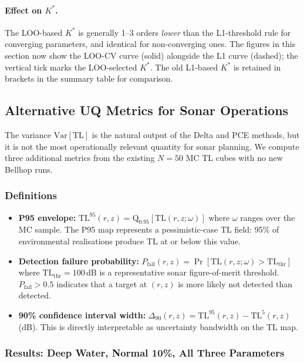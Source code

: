\documentclass[11pt,a4paper]{article}
\newcommand{\Var}{\mathrm{Var}}
\newcommand{\TL}{\mathrm{TL}}
\begin{document}
\paragraph{Effect on $K^*$.}
The LOO-based $K^*$ is generally 1--3 orders \emph{lower} than the L1-threshold
rule for converging parameters, and identical for non-converging ones.  The figures
in this section now show the LOO-CV curve (solid) alongside the L1 curve (dashed);
the vertical tick marks the LOO-selected $K^*$.  The old L1-based $K^*$ is retained
in brackets in the summary table for comparison.

\subsection{Alternative UQ Metrics for Sonar Operations}
\label{sec:metrics}

The variance $\Var[\TL]$ is the natural output of the Delta and PCE methods,
but it is not the most operationally relevant quantity for sonar planning.
We compute three additional metrics from the existing $N=50$ MC TL cubes
with no new Bellhop runs.

\subsubsection{Definitions}

\begin{itemize}
  \item \textbf{P95 envelope:} $\TL^{95}(r,z) = \mathrm{Q}_{0.95}[\TL(r,z;\omega)]$
        where $\omega$ ranges over the MC sample.  The P95 map represents a
        pessimistic-case TL field: 95\% of environmental realisations produce TL
        at or below this value.
  \item \textbf{Detection failure probability:}
        $P_\mathrm{fail}(r,z) = \Pr[\TL(r,z;\omega) > \TL_\mathrm{thr}]$
        where $\TL_\mathrm{thr} = 100$\,dB is a representative sonar figure-of-merit
        threshold.  $P_\mathrm{fail} > 0.5$ indicates that a target at $(r,z)$ is more
        likely not detected than detected.
  \item \textbf{90\% confidence interval width:}
        $\Delta_{90}(r,z) = \TL^{95}(r,z) - \TL^{5}(r,z)$ (dB).
        This is directly interpretable as uncertainty bandwidth on the TL map.
\end{itemize}

\subsubsection{Results: Deep Water, Normal 10\%, All Three Parameters}
\end{document}
